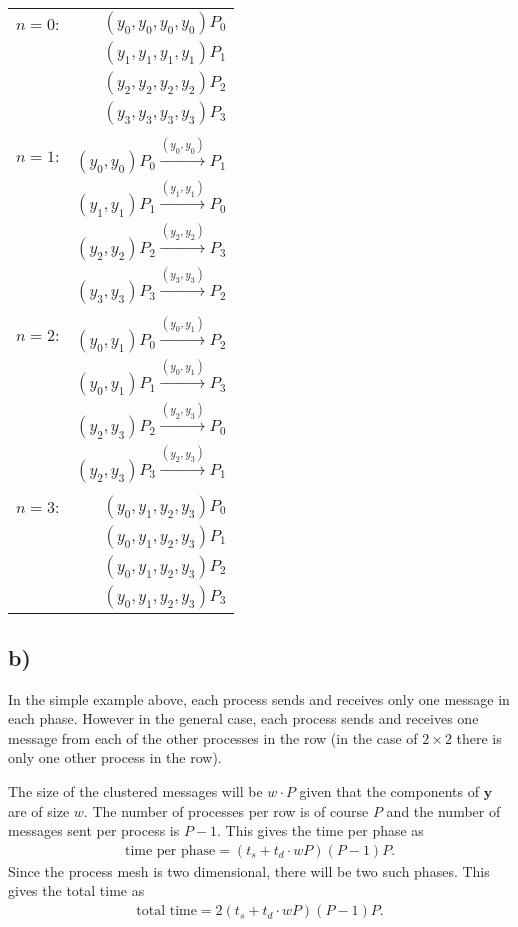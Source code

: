\documentclass[a4paper,11pt]{article}
\newcommand{\ba}[1]{\begin{align*}    #1    \end{align*}}
\renewcommand{\vec}[1]{\mathbf{#1}}
\begin{document}
\begin{center}
\begin{tabular}{l r}
$n=0$: & $(y_0, y_0, y_0, y_0)P_0$\\
& $(y_1, y_1, y_1, y_1)P_1$ \\
& $(y_2, y_2, y_2, y_2)P_2$ \\
& $(y_3, y_3, y_3, y_3)P_3 $ \\ \\
$n=1$: & $(y_0,y_0) P_0 \overset{(y_0,y_0)}{ \longrightarrow} P_1$ \\
& $(y_1,y_1) P_1 \overset{(y_1,y_1)}{ \longrightarrow} P_0$ \\
& $(y_2,y_2) P_2 \overset{(y_2,y_2)}{ \longrightarrow} P_3$ \\
& $(y_3,y_3) P_3 \overset{(y_3,y_3)}{ \longrightarrow} P_2$ \\ \\
$n=2$: & $(y_0,y_1) P_0 \overset{(y_0,y_1)}{ \longrightarrow} P_2$ \\
& $(y_0,y_1) P_1 \overset{(y_0,y_1)}{ \longrightarrow} P_3$ \\
& $(y_2,y_3) P_2 \overset{(y_2,y_3)}{ \longrightarrow} P_0$ \\
& $(y_2,y_3) P_3 \overset{(y_2,y_3)}{ \longrightarrow} P_1$ \\ \\
$n=3$: & $(y_0, y_1, y_2, y_3)P_0$\\
& $(y_0, y_1, y_2, y_3)P_1$ \\
& $(y_0, y_1, y_2, y_3)P_2$ \\
& $(y_0, y_1, y_2, y_3)P_3 $ 
\end{tabular}
\end{center}  

\subsection*{b)}
In the simple example above, each process sends and receives only one message in each phase.  However in the general case, each process sends and receives one message from each of the other processes in the row (in the case of $2 \times 2$ there is only one other process in the row).  

The size of the clustered messages will be $w \cdot P$ given that the components of $\vec{y}$ are of size $w$. The number of processes per row is of course $P$ and the number of messages sent per process is $P-1$.  This gives the time per phase as
\ba{
\text{time per phase} = (t_s + t_d \cdot wP)(P-1)P.
}
Since the process mesh is two dimensional, there will be two such phases.  This gives the total time as
\ba{
\text{total time} = 2(t_s + t_d \cdot wP)(P-1)P.
}
\end{document}
